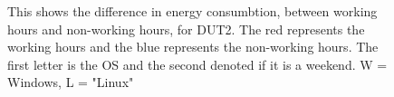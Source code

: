 \begin{figure}[H]
\caption{This shows the difference in energy consumbtion, between working hours and non-working hours, for DUT2. The red represents the working hours and the blue represents the non-working hours. The first letter is the OS and the second denoted if it is a weekend. W = Windows, L = "Linux"} 
\label{tab:RainBowGraph}
\end{figure}